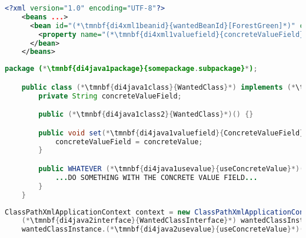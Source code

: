 \begin{lstlisting}[language=XML, title={Configuration XML}]
    <?xml version="1.0" encoding="UTF-8"?>
    <beans ...>
      <bean id="(*\tmnbf{di4xml1beanid}{wantedBeanId}[ForestGreen]*)" class="(*\tmnbf{di4xml1package}{somepackage.subpackage}[ForestGreen]*).(*\tmnbf{di4xml1class}{WantedClass}[ForestGreen]*)">
        <property name="(*\tmnbf{di4xml1valuefield}{concreteValueField}[ForestGreen]*)" value="someValue"/>
      </bean>
    </beans>
\end{lstlisting}
\begin{lstlisting}[language=Java, title={Wanted class with the zero--parameter constructor and the setter method}]
    package (*\tmnbf{di4java1package}{somepackage.subpackage}*);

    public class (*\tmnbf{di4java1class}{WantedClass}*) implements (*\tmnbf{di4java1interface}{WantedClassInterface}*) {
        private String concreteValueField;

        public (*\tmnbf{di4java1class2}{WantedClass}*)() {}

        public void set(*\tmnbf{di4java1valuefield}{ConcreteValueField}*)(String concreteValue) {
            concreteValueField = concreteValue;
        }

        public WHATEVER (*\tmnbf{di4java1usevalue}{useConcreteValue}*)() {
            ...DO SOMETHING WITH THE CONCRETE VALUE FIELD...
        }
    }
\end{lstlisting}
\begin{lstlisting}[language=Java, title={Usage}]
    ClassPathXmlApplicationContext context = new ClassPathXmlApplicationContext("configurationFile.xml");
    (*\tmnbf{di4java2interface}{WantedClassInterface}*) wantedClassInstance = context.getBean("(*\tmnbf{di4java2beanid}{wantedBeanId}[ForestGreen]*)", (*\tmnbf{di4java2interface2}{WantedClassInterface}*).class);
    wantedClassInstance.(*\tmnbf{di4java2usevalue}{useConcreteValue}*)();
\end{lstlisting}
\newpage

